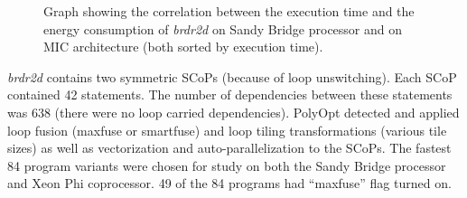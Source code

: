 \begin{figure}[bt]
\centering
{}
\caption{Graph showing the correlation between the execution time and the energy 
consumption of \emph{brdr2d} on Sandy Bridge processor and
on MIC architecture (both sorted by execution time).}
\label{fig:Brdr2d-TE}
\end{figure}

\emph {brdr2d} contains two symmetric SCoPs (because of loop unswitching).
Each SCoP contained 42 statements. The number of dependencies between these 
statements was 638 (there were no loop carried dependencies). PolyOpt
detected and applied loop fusion (maxfuse or smartfuse) and loop tiling transformations
(various tile sizes) as
well as vectorization and auto-parallelization to the SCoPs. The fastest 84 program
variants were chosen for study on both the Sandy Bridge processor and Xeon Phi coprocessor.
49 of the 84 programs had ``maxfuse'' flag turned on.

